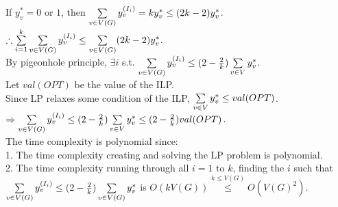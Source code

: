 \begin{pr}
If $y_v^*=0$ or $1$, then $\sum\limits_{v\in V(G)}y_v^{(I_i)}=ky_v^*\leq(2k-2)y_v^*$.\\
$\therefore\sum\limits_{i=1}^k\sum\limits_{v\in V(G)}y_v^{(I_i)}\leq\sum\limits_{v\in V(G)}(2k-2)y_v^*$.\\
By pigeonhole principle, $\exists i$ s.t. $\sum\limits_{v\in V(G)}y_v^{(I_i)}\leq(2-\frac2k)\sum\limits_{v\in V}y_v^*$.\\
Let $val(OPT)$ be the value of the ILP.\\%
Since LP relaxes some condition of the ILP, $\sum\limits_{v\in V}y_v^*\leq val(OPT)$.\\
$\Rightarrow\sum\limits_{v\in V(G)}y_v^{(I_i)}\leq(2-\frac2k)\sum\limits_{v\in V}y_v^*\leq(2-\frac2k)val(OPT)$.\\
The time complexity is polynomial since:\\
1. The time complexity creating and solving the LP problem is polynomial.\\
2. The time complexity running through all $i=1$ to $k$, finding the $i$ such that $\sum\limits_{v\in V(G)}y_v^{(I_i)}\leq(2-\frac2k)\sum\limits_{v\in V(G)}y_v^*$ is $O(kV(G))\overset{k\leq V(G)}\leq O(V(G)^2)$.
\end{pr}
